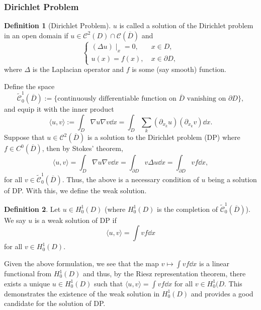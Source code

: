 \documentclass[]{article}
\theoremstyle{definition}
\theoremstyle{definition}
\newtheorem{definition}{Definition}[section]
\begin{document}
\subsubsection{Dirichlet Problem}

\begin{definition}[Dirichlet Problem]
  \(u\) is called a solution of the Dirichlet problem in an open domain if 
  \(u \in \mathcal{C}^2(D) \cap \mathcal{C}(\overline{D})\) and 
  \[\begin{cases}
    (\Delta u)\mid_x = 0, \ & x \in D,\\
    u(x) = f(x), \ & x \in \partial D,
  \end{cases}\]
  where \(\Delta\) is the Laplacian operator and \(f\) is some (say smooth) 
  function.
\end{definition}

Define the space 
\[\tilde{\mathcal{C}}_0^1(\overline{D}) := \{\text{continuously differentiable 
function on \(\overline{D}\) vanishing on \(\partial D\)}\},\]
and equip it with the inner product 
\[\langle u, v \rangle := \int_D \nabla u \nabla v \dd x = 
  \int_D \sum_k (\partial_{x_k} u)(\partial_{x_k} v) \dd x.\]
Suppose that \(u \in \mathcal{C}^2(\overline{D})\) is a solution 
to the Dirichlet problem (DP) where \(f \in C^0(\overline{D})\), then by 
Stokes' theorem, 
\[\langle u, v \rangle = \int_D \nabla u \nabla v \dd x = 
  \int_{\partial D} v \Delta u \dd x = \int_{\partial D} v f \dd x,\]
for all \(v \in \tilde{\mathcal{C}}_0^1(\overline{D})\). 
Thus, the above is a necessary condition of \(u\) being a solution of 
DP. With this, we define the weak solution.

\begin{definition}
  Let \(u \in H^1_0(D)\) (where \(H^1_0(D)\) is the completion of 
  \(\tilde{\mathcal{C}}_0^1(\overline{D})\)). We say \(u\) is a weak 
  solution of DP if 
  \[\langle u, v\rangle = \int vf \dd x\]
  for all \(v \in H^1_0(D)\).
\end{definition}

Given the above formulation, we see that the map \(v \mapsto \int vf \dd x\) 
is a linear functional from \(H_0^1(D)\) and thus, by the Riesz representation 
theorem, there exists a unique \(u \in H_0^1(D)\) such that 
\(\langle u, v \rangle = \int v f \dd x\) for all \(v \in H_0^1(D\). This 
demonstrates the existence of the weak solution in \(H_0^1(D)\) and provides 
a good candidate for the solution of DP.

\end{document}
